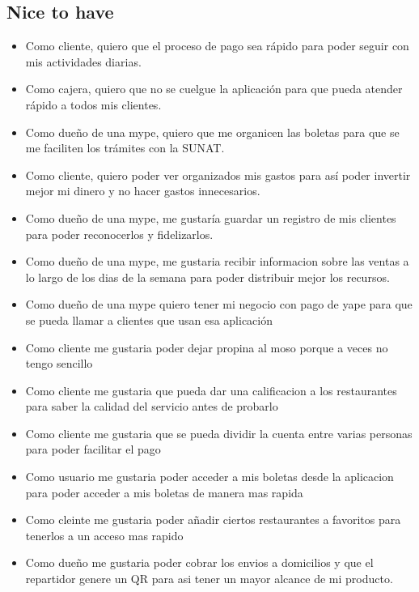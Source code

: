 \documentclass{article}
\begin{document}
\subsection{Nice to have}
\begin{itemize}
        \item Como cliente, quiero que el proceso de pago sea rápido para poder seguir con mis actividades diarias.
        \item Como cajera, quiero que no se cuelgue la aplicación para que pueda atender rápido a todos mis clientes.
        \item Como dueño de una mype, quiero que me organicen las boletas para que se me faciliten los trámites con la SUNAT.
        \item Como cliente, quiero poder ver organizados mis gastos para así poder invertir mejor mi dinero y no hacer gastos innecesarios.
        \item Como dueño de una mype, me gustaría guardar un registro de mis clientes para poder reconocerlos y fidelizarlos.
        \item Como dueño de una mype, me gustaria recibir informacion sobre las ventas a lo largo de los dias de la semana para poder distribuir mejor los recursos.
        \item Como dueño de una mype quiero tener mi negocio con pago de yape para que se pueda llamar a clientes que usan esa aplicación
        \item Como cliente me gustaria poder dejar propina al moso porque a veces no tengo sencillo
        \item Como cliente me gustaria que pueda dar una calificacion a los restaurantes para saber la calidad del servicio antes de probarlo
        \item Como cliente me gustaria que se pueda dividir la cuenta entre varias personas para poder facilitar el pago
        \item Como usuario me gustaria poder acceder a mis boletas desde la aplicacion para poder acceder a mis boletas de manera mas rapida
        \item Como cleinte me gustaria poder añadir ciertos restaurantes a favoritos para tenerlos a un acceso mas rapido
        \item Como dueño me gustaria poder cobrar los envios a domicilios y que el repartidor genere un QR para asi tener un mayor alcance de mi producto.





\end{itemize}
\end{document}
